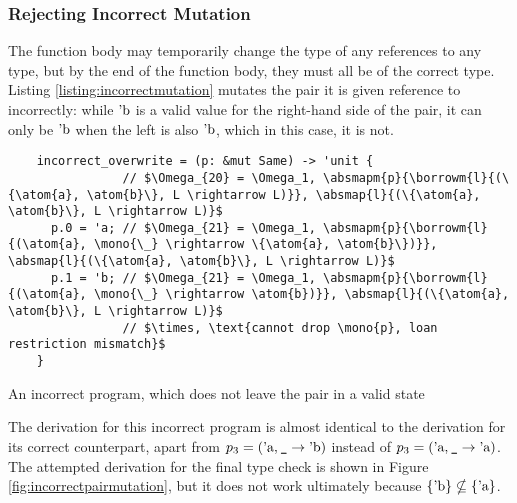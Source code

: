 \documentclass[12pt,twoside]{report}
\begin{document}
\subsubsection{Rejecting Incorrect Mutation}
The function body may temporarily change the type of any references to any type, but by the end of the function body, they must all be of the correct type. Listing \ref{listing:incorrectmutation} mutates the pair it is given reference to incorrectly: while $\text{'b}$ is a valid value for the right-hand side of the pair, it can only be $\text{'b}$ when the left is also $\text{'b}$, which in this case, it is not.

\begin{listing}
  \begin{verbatim}
    incorrect_overwrite = (p: &mut Same) -> 'unit {
                // $\Omega_{20} = \Omega_1, \absmapm{p}{\borrowm{l}{(\{\atom{a}, \atom{b}\}, L \rightarrow L)}}, \absmap{l}{(\{\atom{a}, \atom{b}\}, L \rightarrow L)}$
      p.0 = 'a; // $\Omega_{21} = \Omega_1, \absmapm{p}{\borrowm{l}{(\atom{a}, \mono{\_} \rightarrow \{\atom{a}, \atom{b}\})}}, \absmap{l}{(\{\atom{a}, \atom{b}\}, L \rightarrow L)}$
      p.1 = 'b; // $\Omega_{21} = \Omega_1, \absmapm{p}{\borrowm{l}{(\atom{a}, \mono{\_} \rightarrow \atom{b})}}, \absmap{l}{(\{\atom{a}, \atom{b}\}, L \rightarrow L)}$
                // $\times, \text{cannot drop \mono{p}, loan restriction mismatch}$ 
    }   
  \end{verbatim}
  \caption{An incorrect program, which does not leave the pair in a valid state}
  \label{listing:incorrectmutation}
\end{listing}

The derivation for this incorrect program is almost identical to the derivation for its correct counterpart, apart from $p_3 = (\text{'a}, \text{\texttt{\_}} \rightarrow \text{'b})$ instead of $p_3 = (\text{'a}, \text{\texttt{\_}} \rightarrow \text{'a})$. The attempted derivation for the final type check is shown in Figure \ref{fig:incorrectpairmutation}, but it does not work ultimately because $\{\text{'b}\} \nsubseteq \{\text{'a}\}$.
\end{document}
